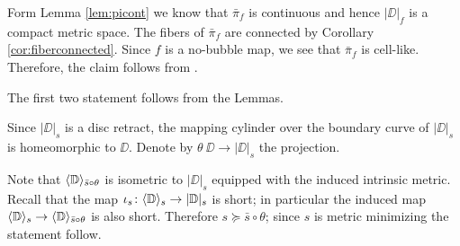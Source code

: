 Form Lemma \ref{lem:picont} we know that $\bar\pi_f$ is continuous and hence $|\DD|_f$
is a compact metric space. 
The fibers of $\bar\pi_f$ are connected by Corollary \ref{cor:fiberconnected}.
Since $f$ is a no-bubble map, we see that $\bar\pi_f$ is cell-like. 
Therefore, the claim follows from \cite[Corollary 7.12]{LW3}.
\qeds

The first two statement follows from the Lemmas.

Since $|\DD|_s$ is a disc retract, the mapping cylinder over the boundary curve of $|\DD|_s$ is homeomorphic to $\DD$.
Denote by $\theta\:\DD\to |\DD|_s$ the projection.

Note that $\langle\mathbb{D}\rangle_{\bar s\circ\theta}$ is isometric to $|\DD|_s$ equipped with the induced intrinsic metric.
Recall that the map $\iota_s\colon\langle\mathbb{D}\rangle_s\to|\mathbb{D}|_s$ is short;
in particular the induced map $\langle\mathbb{D}\rangle_s\to\langle\mathbb{D}\rangle_{\bar s\circ\theta}$ is also short.
Therefore $s\succcurlyeq \bar s\circ\theta$;
since $s$ is metric minimizing the statement follow.
\qeds
